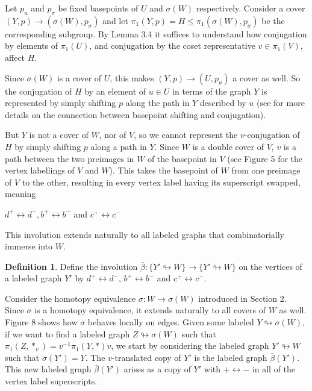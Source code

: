\documentclass[11pt,hyp,]{nyjm}
\theoremstyle{definition}
\newtheorem{definition}[theorem]{Definition}
\begin{document}
Let $p_u$ and $p_\sigma$ be fixed basepoints of $U$ and $\sigma(W)$ respectively. Consider a cover $(Y,p)\to(\sigma(W),p_\sigma)$ and let $\pi_1(Y,p)=H\leq\pi_1(\sigma(W),p_\sigma)$ be the corresponding subgroup. By Lemma 3.4 it suffices to understand how conjugation by elements of $\pi_1(U)$, and conjugation by the coset representative $v\in\pi_1(V)$, affect $H$.

Since $\sigma(W)$ is a cover of $U$, this makes $(Y,p)\to(U,p_u)$ a cover as well. So the conjugation of $H$ by an element of $u\in U$ in terms of the graph $Y$ is represented by simply shifting $p$ along the path in $Y$ described by $u$ (see \cite{MR1867354} for more details on the connection between basepoint shifting and conjugation).

But $Y$ is not a cover of $W$, nor of $V$, so we cannot represent the $v$-conjugation of $H$ by simply shifting $p$ along a path in $Y$. Since $W$ is a double cover of $V$, $v$ is a path between the two preimages in $W$ of the basepoint in $V$ (see Figure 5 for the vertex labellings of $V$ and $W$). This takes the basepoint of $W$ from one preimage of $V$ to the other, resulting in every vertex label having its superscript swapped, meaning
\begin{center}
$d^+\leftrightarrow d^-,b^+\leftrightarrow b^-$ and $c^+\leftrightarrow c^-$
\end{center}

This involution extends naturally to all labeled graphs that combinatorially immerse into $W$.

\begin{definition}
    Define the involution $\bar{\beta}:\{Y'\looparrowright W\}\to\{Y'\looparrowright W\}$ on the vertices of a labeled graph $Y'$ by $d^+\leftrightarrow d^-$, $b^+\leftrightarrow b^-$ and $c^+\leftrightarrow c^-$.
\end{definition} 

Consider the homotopy equivalence $\sigma:W\to \sigma(W)$ introduced in Section 2. Since $\sigma$ is a homotopy equivalence, it extends naturally to all covers of $W$ as well. Figure 8 shows how $\sigma$ behaves locally on edges. Given some labeled $Y\looparrowright \sigma(W)$, if we want to find a labeled graph $Z\looparrowright \sigma(W)$ such that $\pi_1(Z, *_v)=v^{-1}\pi_1(Y, *)v$, we start by considering the labeled graph $Y'\looparrowright W$ such that $\sigma(Y')=Y$. The $v$-translated copy of $Y'$ is the labeled graph $\bar{\beta}(Y')$. This new labeled graph $\bar{\beta}(Y')$ arises as a copy of $Y'$ with $+\leftrightarrow -$ in all of the vertex label superscripts. 
\end{document}
